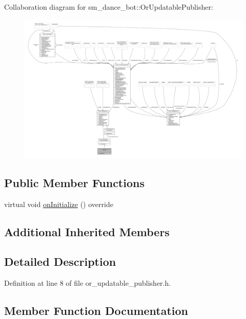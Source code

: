 Collaboration diagram for sm\+\_\+dance\+\_\+bot\+:\+:Or\+Updatable\+Publisher\+:
\nopagebreak
\begin{figure}[H]
\begin{center}
\leavevmode
\includegraphics[width=350pt]{classsm__dance__bot_1_1OrUpdatablePublisher__coll__graph}
\end{center}
\end{figure}
\subsection*{Public Member Functions}
\begin{DoxyCompactItemize}
\item 
virtual void \hyperlink{classsm__dance__bot_1_1OrUpdatablePublisher_a7de06135fd7ddea74ad9bb547fb6e79a}{on\+Initialize} () override
\end{DoxyCompactItemize}
\subsection*{Additional Inherited Members}


\subsection{Detailed Description}


Definition at line 8 of file or\+\_\+updatable\+\_\+publisher.\+h.



\subsection{Member Function Documentation}
